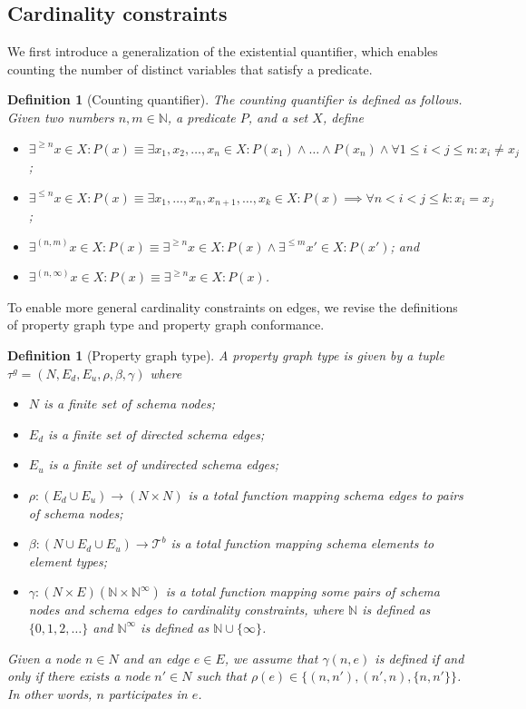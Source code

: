 \documentclass[a4paper]{article}
\makeatletter
\newtheorem{definition}[theorem]{Definition}
\newcommand{\N}{\mathbb{N}}
\newcommand{\btypes}{\mathcal{T}^b}
\newcommand{\gtype}{\tau^g}
\newcommand{\pto}{}%
\DeclareRobustCommand{\pto}{\mathrel{\mathpalette\p@to@gets\to}}
\newcommand{\p@to@gets}[2]{%
  \ooalign{\hidewidth$\m@th#1\mapstochar\mkern5mu$\hidewidth\cr$\m@th#1\to$\cr}%
}
\makeatother
\begin{document}
\subsection{Cardinality constraints}

We first introduce a generalization of the existential quantifier, which enables counting the number of distinct variables that satisfy a predicate.

\begin{definition}[Counting quantifier]
  The \emph{counting quantifier} is defined as follows. Given two numbers $n, m \in \N$, a predicate $P$, and a set $X$, define
  \begin{itemize}
    \item $\exists^{\geq n} x \in X : P(x) \equiv \exists x_1, x_2, \ldots, x_n \in X : P(x_1) \wedge \ldots \wedge P(x_n) \wedge \forall 1 \leq i < j \leq n : x_i \neq x_j$;
    \item $\exists^{\leq n} x \in X : P(x) \equiv \exists x_1, \ldots, x_n, x_{n+1}, \ldots, x_k \in X : P(x) \implies \forall n < i < j \leq k : x_i = x_j$;
    \item $\exists^{(n, m)} x \in X : P(x) \equiv \exists^{\geq n} x \in X : P(x) \wedge \exists^{\leq m} x' \in X : P(x')$; and
    \item $\exists^{(n, \infty)} x \in X : P(x) \equiv \exists^{\geq n} x \in X : P(x)$.
  \end{itemize}
\end{definition}

To enable more general cardinality constraints on edges, we revise the definitions of property graph type and property graph conformance.

\begin{definition}[Property graph type]
  A \emph{property graph type} is given by a tuple $\gtype = (N, E_d, E_u, \rho, \beta, \gamma)$ where 
  \begin{itemize}
    \item $N$ is a finite set of schema nodes;
    \item $E_d$ is a finite set of directed schema edges;
    \item $E_u$ is a finite set of undirected schema edges;
    \item $\rho : (E_d \cup E_u) \to (N \times N)$ is a total function mapping schema edges to pairs of schema nodes;
    \item $\beta : (N \cup E_d \cup E_u) \to \btypes$ is a total function mapping schema elements to element types;
    \item $\gamma : (N \times E) \pto (\N \times \N^\infty)$ is a total function mapping some pairs of schema nodes and schema edges to cardinality constraints, where $\N$ is defined as $\{0, 1, 2, \ldots\}$ and $\N^\infty$ is defined as $\N \cup \{\infty\}$.
  \end{itemize}
  Given a node $n \in N$ and an edge $e \in E$, we assume that $\gamma(n, e)$ is defined if and only if there exists a node $n' \in N$ such that $\rho(e) \in \{(n, n'), (n', n), \{n, n'\}\}$. In other words, $n$ \emph{participates} in $e$.
\end{definition}
\end{document}

